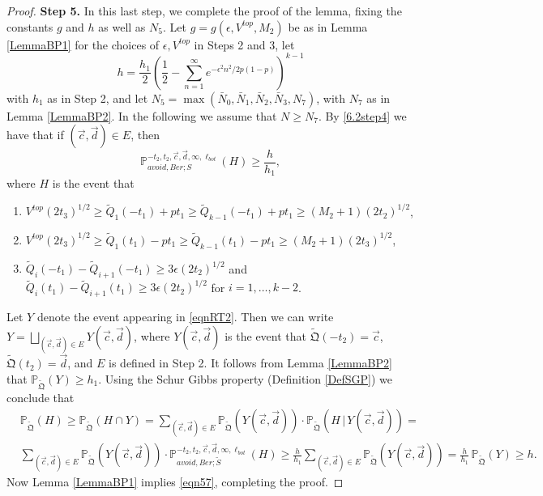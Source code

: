 \begin{proof}
	{\bf \raggedleft Step 5.} In this last step, we complete the proof of the lemma, fixing the constants $g$ and $h$ as well as $N_5$. Let $g=g(\epsilon,V^{top},M_2)$ be as in Lemma \ref{LemmaBP1} for the choices of $\epsilon,V^{top}$ in Steps 2 and 3, let
	\[
	h = \frac{h_1}{2}\left(\frac{1}{2} - \sum_{n=1}^\infty e^{-\epsilon^2 n^2/2p(1-p)}\right)^{k-1}
	\]
	with $h_1$ as in Step 2, and let $N_5 = \max(\bar{N}_0,\bar{N}_1,\bar{N}_2,\bar{N}_3,N_7)$, with $N_7$ as in Lemma \ref{LemmaBP2}. In the following we assume that $N\geq N_7$. By \eqref{6.2step4} we have that if $(\vec{c},\vec{d})\in E$, then
	$$\mathbb{P}_{avoid, Ber;S}^{-t_2, t_2, \vec{c}, \vec{d}, \infty, \ell_{bot}} ( H) \geq \frac{h}{h_1},$$
	where $H$ is the event that
	
	\begin{enumerate}
		\item $V^{top} (2t_3)^{1/2} \geq \tilde Q_1(-t_1) + p t_1 \geq \tilde Q_{k-1}(-t_1) + pt_1 \geq (M_2 + 1) (2t_2)^{1/2}$,
		\item $V^{top} (2t_3)^{1/2} \geq \tilde Q_1(t_1) - p t_1 \geq \tilde Q_{k-1}(t_1) - pt_1 \geq (M_2 + 1) (2t_3)^{1/2}$,
		\item $\tilde Q_i(-t_1) - \tilde Q_{i+1}(-t_1) \geq 3\epsilon (2t_2)^{1/2}$ and $\tilde Q_i(t_1) - \tilde Q_{i+1}(t_1)  \geq 3 \epsilon (2t_2)^{1/2}$ for $i = 1, \dots, k-2$.
	\end{enumerate}
	Let $Y$ denote the event appearing in \eqref{eqnRT2}. Then we can write $Y = \bigsqcup_{(\vec{c},\vec{d})\in E} Y(\vec{c},\vec{d})$, where $Y(\vec{c},\vec{d})$ is the event that $\tilde{\mathfrak{Q}}(-t_2) = \vec{c}$, $\tilde{\mathfrak{Q}}(t_2) = \vec{d}$, and $E$ is defined in Step 2. It follows from Lemma \ref{LemmaBP2} that $\mathbb{P}_{\tilde{\mathfrak Q}}(Y) \geq h_1$. Using the Schur Gibbs property (Definition \ref{DefSGP}) we conclude that
	\begin{align*}
	&\mathbb{P}_{\tilde{\mathfrak{Q}}}(H) \geq \mathbb{P}_{\tilde{\mathfrak{Q}}}(H\cap Y) = \sum_{(\vec{c},\vec{d})\in E} \mathbb{P}_{\tilde{\mathfrak{Q}}}(Y(\vec{c},\vec{d}))\cdot \mathbb{P}_{\tilde{\mathfrak{Q}}}(H\,|\,Y(\vec{c},\vec{d})) =\\
	&\sum_{(\vec{c},\vec{d})\in E} \mathbb{P}_{\tilde{\mathfrak{Q}}}(Y(\vec{c},\vec{d}))\cdot \mathbb{P}^{-t_2,t_2,\vec{c},\vec{d},\infty,\ell_{bot}}_{avoid,Ber;\tilde S}(H) \geq \frac{h}{h_1}\sum_{(\vec{c},\vec{d})\in E} \mathbb{P}_{\tilde{\mathfrak{Q}}}(Y(\vec{c},\vec{d})) = \frac{h}{h_1}\,\mathbb{P}_{\tilde{\mathfrak{Q}}}(Y) \geq h.
	\end{align*}
	Now Lemma \ref{LemmaBP1} implies \eqref{eqn57}, completing the proof.
\end{proof}